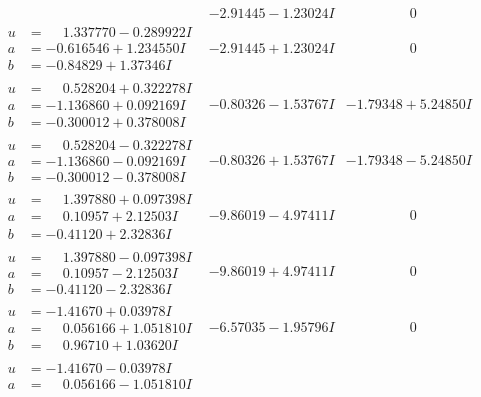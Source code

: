 \documentclass[1p]{elsarticle_modified}
\theoremstyle{definition}
\begin{document}
$$\begin{array}{c|c|c}
 & -2.91445 - 1.23024 I & \phantom{-0.000000 } 0 \\ \hline\begin{aligned}
u &= \phantom{-}1.337770 - 0.289922 I \\
a &= -0.616546 + 1.234550 I \\
b &= -0.84829 + 1.37346 I\end{aligned}
 & -2.91445 + 1.23024 I & \phantom{-0.000000 } 0 \\ \hline\begin{aligned}
u &= \phantom{-}0.528204 + 0.322278 I \\
a &= -1.136860 + 0.092169 I \\
b &= -0.300012 + 0.378008 I\end{aligned}
 & -0.80326 - 1.53767 I & -1.79348 + 5.24850 I \\ \hline\begin{aligned}
u &= \phantom{-}0.528204 - 0.322278 I \\
a &= -1.136860 - 0.092169 I \\
b &= -0.300012 - 0.378008 I\end{aligned}
 & -0.80326 + 1.53767 I & -1.79348 - 5.24850 I \\ \hline\begin{aligned}
u &= \phantom{-}1.397880 + 0.097398 I \\
a &= \phantom{-}0.10957 + 2.12503 I \\
b &= -0.41120 + 2.32836 I\end{aligned}
 & -9.86019 - 4.97411 I & \phantom{-0.000000 } 0 \\ \hline\begin{aligned}
u &= \phantom{-}1.397880 - 0.097398 I \\
a &= \phantom{-}0.10957 - 2.12503 I \\
b &= -0.41120 - 2.32836 I\end{aligned}
 & -9.86019 + 4.97411 I & \phantom{-0.000000 } 0 \\ \hline\begin{aligned}
u &= -1.41670 + 0.03978 I \\
a &= \phantom{-}0.056166 + 1.051810 I \\
b &= \phantom{-}0.96710 + 1.03620 I\end{aligned}
 & -6.57035 - 1.95796 I & \phantom{-0.000000 } 0 \\ \hline\begin{aligned}
u &= -1.41670 - 0.03978 I \\
a &= \phantom{-}0.056166 - 1.051810 I \\

\end{aligned}
\end{array}$$
\end{document}
